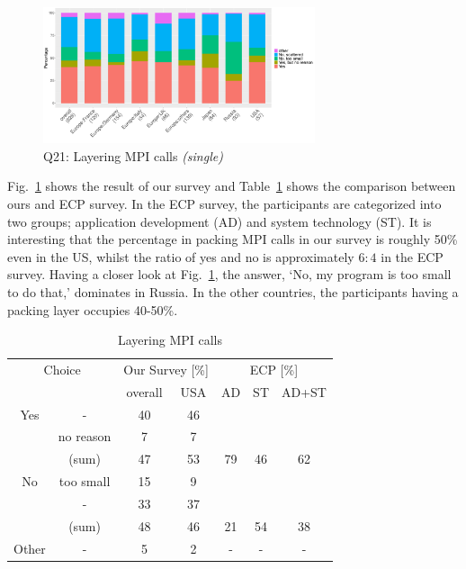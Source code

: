 \documentclass[conference,10pt,letterpaper]{IEEEtran}
\def\myquote#1{`#1'}
\begin{document}
\begin{figure}[htb]
\begin{center}
\includegraphics[width=8cm]{R-scripts/Q21.pdf}
\caption{Q21: Layering MPI calls {\it(single)}}
\label{fig:layering-mpi-calls}
\end{center}
\end{figure}

Fig.~\ref{fig:layering-mpi-calls} shows the result of our survey and
Table~\ref{tab:layering-mpi-calls} shows the comparison between ours
and ECP survey. In the ECP survey, the participants are categorized
into two groups; application development (AD) and system technology
(ST). It is interesting that the percentage in packing MPI calls
in our survey is roughly 50\% even in the US, whilst the ratio of yes
and no is approximately $6:4$ in the ECP survey.
Having a closer look at Fig.~\ref{fig:layering-mpi-calls}, the answer,
\myquote{No, my program is too small to do that,} dominates in Russia. In
the other countries, the participants having a packing layer occupies
40-50\%. 

\begin{table}[htb]%
\begin{center}%
\caption{Layering MPI calls}\label{tab:layering-mpi-calls}%
\begin{tabular}{c|c||c|c||c|c|c}%
\hline%
\multicolumn{2}{c||}{Choice} & \multicolumn{2}{c||}{Our Survey [\%]} &
\multicolumn{3}{c}{ECP [\%]} \\
\cline{3-7}%
\multicolumn{2}{c||}{} & overall & USA & AD & ST & AD+ST \\
\hline%
\hline%
Yes & - & 40 & 46 & & & \\
& no reason & 7 & 7 & & & \\
\cline{2-4}%
 & (sum) & 47 & 53 &  79 & 46 & 62 \\
\hline%
\hline%
No & too small & 15 & 9 & & & \\
& - & 33 & 37 & & & \\
\cline{2-4}%
 & (sum) & 48 & 46 & 21 & 54 & 38 \\
\hline%
Other & - & 5 & 2 & - & - & - \\
\hline%
\end{tabular}%
\end{center}%
\end{table}%
\end{document}
